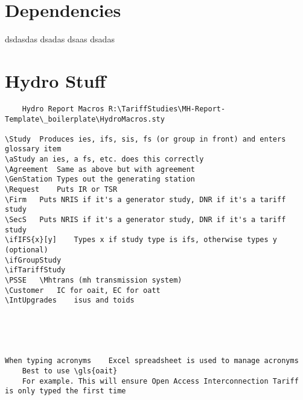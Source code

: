 \documentclass[compact]{corpboreport}
\begin{document}
\section{Dependencies}
dsdasdas dsadas
dsaas dsadas

\PrintEndOfDocument*

\section{Hydro Stuff}

\begin{lstlisting}
	Hydro Report Macros	R:\TariffStudies\MH-Report-Template\_boilerplate\HydroMacros.sty

\Study	Produces ies, ifs, sis, fs (or group in front) and enters glossary item
\aStudy	an ies, a fs, etc. does this correctly
\Agreement	Same as above but with agreement
\GenStation	Types out the generating station
\Request	Puts IR or TSR
\Firm	Puts NRIS if it's a generator study, DNR if it's a tariff study
\SecS	Puts NRIS if it's a generator study, DNR if it's a tariff study
\ifIFS{x}[y]	Types x if study type is ifs, otherwise types y (optional)
\ifGroupStudy
\ifTariffStudy
\PSSE	\Mhtrans (mh transmission system)
\Customer	IC for oait, EC for oatt
\IntUpgrades	isus and toids





When typing acronyms	Excel spreadsheet is used to manage acronyms
	Best to use \gls{oait}
	For example. This will ensure Open Access Interconnection Tariff is only typed the first time

\end{lstlisting}
\end{document}
